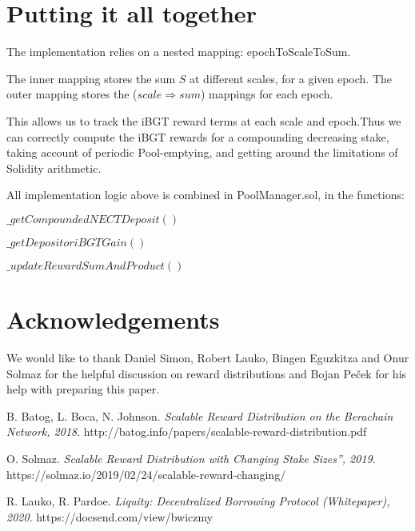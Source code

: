 \documentclass[reqno]{article}
\begin{document}
\bigskip
\section{Putting it all together}

\bigskip
The implementation relies on a nested mapping: epochToScaleToSum. 

\bigskip
The inner mapping stores the sum $S$ at different scales, for a given epoch. The outer mapping stores the ($scale \Rightarrow sum$) mappings for each epoch.

\bigskip
This allows us to track the iBGT reward terms at each scale and epoch.Thus we can correctly compute the iBGT rewards for a compounding decreasing stake, taking account of periodic Pool-emptying, and getting around the limitations of Solidity arithmetic.

\bigskip
All implementation logic above is combined in PoolManager.sol, in the functions:

\bigskip
$\_getCompoundedNECTDeposit()$

$\_getDepositoriBGTGain()$

$\_updateRewardSumAndProduct()$

\section{Acknowledgements}
We would like to thank Daniel Simon, Robert Lauko, Bingen Eguzkitza and Onur Solmaz for the helpful discussion on reward distributions and Bojan Peček for his help with preparing this paper.

\begin{thebibliography}{9}
B. Batog, L. Boca, N. Johnson.
\textit{Scalable Reward Distribution on the Berachain Network, 2018}. 
http://batog.info/papers/scalable-reward-distribution.pdf

O. Solmaz. 
\textit{Scalable Reward Distribution with Changing Stake Sizes”, 2019}. 
https://solmaz.io/2019/02/24/scalable-reward-changing/

R. Lauko, R. Pardoe. 
\textit{Liquity: Decentralized Borrowing Protocol (Whitepaper), 2020}. 
https://docsend.com/view/bwiczmy


\end{thebibliography}
\end{document}
